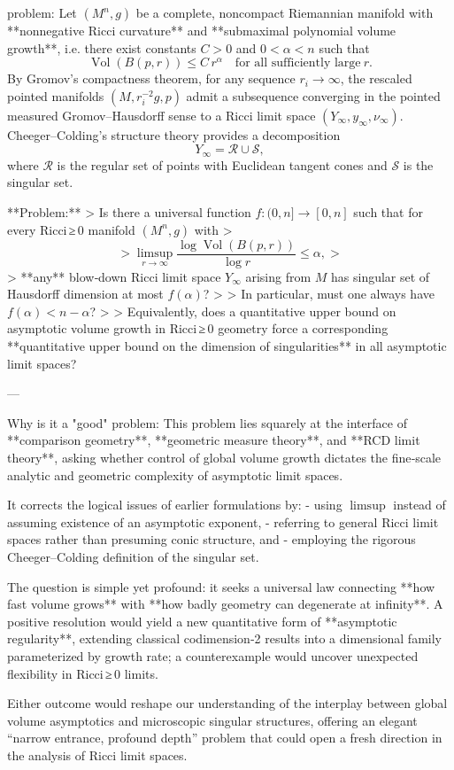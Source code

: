 problem:  
Let \((M^n,g)\) be a complete, noncompact Riemannian manifold with **nonnegative Ricci curvature** and **submaximal polynomial volume growth**, i.e. there exist constants \(C>0\) and \(0<\alpha<n\) such that  
\[
\operatorname{Vol}(B(p,r)) \le C\,r^{\alpha}
\quad\text{for all sufficiently large}\ r.
\]
By Gromov’s compactness theorem, for any sequence \(r_i \to \infty\), the rescaled pointed manifolds \((M, r_i^{-2}g, p)\) admit a subsequence converging in the pointed measured Gromov–Hausdorff sense to a Ricci limit space \((Y_\infty, y_\infty, \nu_\infty)\).  
Cheeger–Colding’s structure theory provides a decomposition
\[
Y_\infty = \mathcal{R} \cup \mathcal{S},
\]
where \(\mathcal{R}\) is the regular set of points with Euclidean tangent cones and \(\mathcal{S}\) is the singular set.

**Problem:**  
> Is there a universal function \(f:(0,n]\to [0,n]\) such that for every Ricci ≥ 0 manifold \((M^n,g)\) with  
> \[
> \limsup_{r\to\infty}\frac{\log \operatorname{Vol}(B(p,r))}{\log r} \le \alpha,
> \]
> **any** blow‑down Ricci limit space \(Y_\infty\) arising from \(M\) has singular set of Hausdorff dimension at most \(f(\alpha)\)?  
> 
> In particular, must one always have \(f(\alpha) < n-\alpha\)?  
>  
> Equivalently, does a quantitative upper bound on asymptotic volume growth in Ricci ≥ 0 geometry force a corresponding **quantitative upper bound on the dimension of singularities** in all asymptotic limit spaces?

---

Why is it a "good" problem:  
This problem lies squarely at the interface of **comparison geometry**, **geometric measure theory**, and **RCD limit theory**, asking whether control of global volume growth dictates the fine‑scale analytic and geometric complexity of asymptotic limit spaces.  

It corrects the logical issues of earlier formulations by:
- using \(\limsup\) instead of assuming existence of an asymptotic exponent,  
- referring to general Ricci limit spaces rather than presuming conic structure, and  
- employing the rigorous Cheeger–Colding definition of the singular set.

The question is simple yet profound: it seeks a universal law connecting **how fast volume grows** with **how badly geometry can degenerate at infinity**.  
A positive resolution would yield a new quantitative form of **asymptotic regularity**, extending classical codimension‑2 results into a dimensional family parameterized by growth rate; a counterexample would uncover unexpected flexibility in Ricci ≥ 0 limits.  

Either outcome would reshape our understanding of the interplay between global volume asymptotics and microscopic singular structures, offering an elegant “narrow entrance, profound depth” problem that could open a fresh direction in the analysis of Ricci limit spaces.